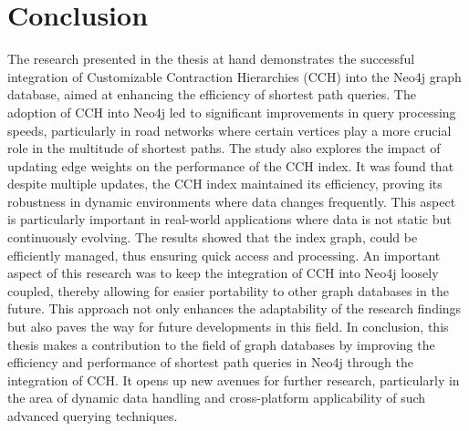 \chapter{Conclusion}

The research presented in the thesis at hand demonstrates the successful integration of Customizable Contraction Hierarchies (CCH) into the Neo4j graph database, aimed at enhancing the efficiency of shortest path queries.
The adoption of CCH into Neo4j led to significant improvements in query processing speeds, particularly in road networks where certain vertices play a more crucial role in the multitude of shortest paths.
The study also explores  the impact of updating edge weights on the performance of the CCH index.
It was found that despite multiple updates, the CCH index maintained its efficiency, proving its robustness in dynamic environments where data changes frequently.
This aspect is particularly important in real-world applications where data is not static but continuously evolving.
The results showed that the index graph, could be efficiently managed, thus ensuring quick access and processing.
An important aspect of this research was to keep the integration of CCH into Neo4j loosely coupled, thereby allowing for easier portability to other graph databases in the future.
This approach not only enhances the adaptability of the research findings but also paves the way for future developments in this field.
In conclusion, this thesis makes a contribution to the field of graph databases by improving the efficiency and performance of shortest path queries in Neo4j through the integration of CCH.
It opens up new avenues for further research, particularly in the area of dynamic data handling and cross-platform applicability of such advanced querying techniques.

